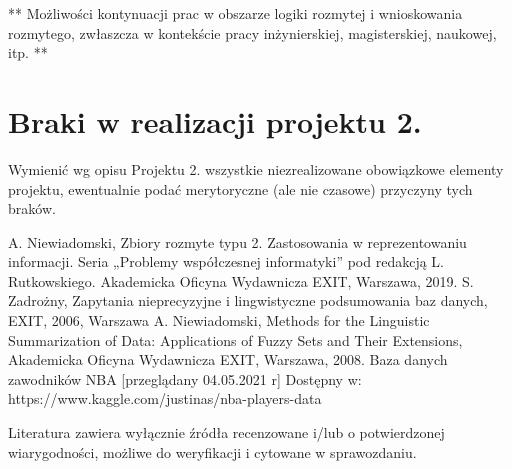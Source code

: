 \documentclass{classrep}
\begin{document}
** Możliwości kontynuacji prac w obszarze logiki rozmytej i wnioskowania rozmytego, zwłaszcza w kontekście pracy inżynierskiej,
magisterskiej, naukowej, itp. **\\



\section{Braki w realizacji projektu 2.}
Wymienić wg opisu Projektu 2. wszystkie niezrealizowane obowiązkowe elementy projektu, ewentualnie
podać merytoryczne (ale nie czasowe) przyczyny tych braków. 


\begin{thebibliography}{99}
  A. Niewiadomski, Zbiory rozmyte typu 2. Zastosowania w reprezentowaniu informacji.  Seria „Problemy współczesnej informatyki” pod redakcją L. Rutkowskiego. Akademicka Oficyna Wydawnicza EXIT, Warszawa, 2019.
 S. Zadrożny, Zapytania nieprecyzyjne i lingwistyczne podsumowania baz danych, EXIT, 2006, Warszawa
 A. Niewiadomski, Methods for the Linguistic Summarization of Data: Applications of Fuzzy Sets and Their Extensions, Akademicka Oficyna Wydawnicza EXIT, Warszawa, 2008.
 Baza danych zawodników NBA [przeglądany 04.05.2021 r] Dostępny w: https://www.kaggle.com/justinas/nba-players-data
\end{thebibliography}

Literatura zawiera wyłącznie źródła recenzowane i/lub o potwierdzonej wiarygodności,
możliwe do weryfikacji i cytowane w sprawozdaniu. 
\end{document}
